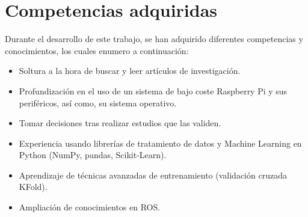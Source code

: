 \section{Competencias adquiridas}

Durante el desarrollo de este trabajo, se han adquirido diferentes competencias y conocimientos, los cuales enumero a continuación:

\begin{itemize}
    \item Soltura a la hora de buscar y leer artículos de investigación.
    
    \item Profundización en el uso de un sistema de bajo coste Raspberry Pi y sus periféricos, así como, su sistema operativo.
    
    \item Tomar decisiones tras realizar estudios que las validen.
    
    \item Experiencia usando librerías de tratamiento de datos y Machine Learning en Python (NumPy, pandas, Scikit-Learn).
    
    \item Aprendizaje de técnicas avanzadas de entrenamiento (validación cruzada KFold).
    
    \item Ampliación de conocimientos en ROS.
\end{itemize}

